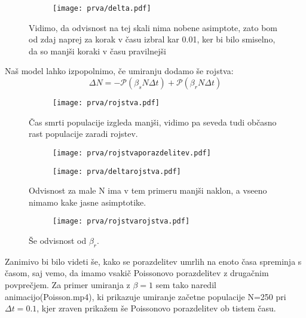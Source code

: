 \documentclass{article}
\begin{document}
\begin{figure}[H]
\centering
\begin{subfigure}{.7\textwidth}
\texttt{[image: prva/delta.pdf]}
\end{subfigure}
\caption*{Vidimo, da odvisnost na tej skali nima nobene asimptote, zato bom od zdaj naprej za korak v času izbral kar 0.01, ker bi bilo smiselno, da so manjši koraki v času pravilnejši}
\end{figure}

Naš model lahko izpopolnimo, če umiranju dodamo še rojstva:
\begin{equation*}
\Delta N = - \mathscr{P}(\beta_s N \Delta t) + \mathscr{P}(\beta_r N \Delta t)
\end{equation*}

\begin{figure}[H]
\centering
\begin{subfigure}{.7\textwidth}
\texttt{[image: prva/rojstva.pdf]}
\end{subfigure}
\caption*{Čas smrti populacije izgleda manjši, vidimo pa seveda tudi občasno rast populacije zaradi rojstev.}
\end{figure}

\begin{figure}[H]
\centering
\begin{subfigure}{.7\textwidth}
\texttt{[image: prva/rojstvaporazdelitev.pdf]}
\end{subfigure}
\caption*{}
\end{figure}

\begin{figure}[H]
\centering
\begin{subfigure}{.7\textwidth}
\texttt{[image: prva/deltarojstva.pdf]}
\end{subfigure}
\caption*{Odvisnost za male N ima v tem primeru manjši naklon, a vseeno nimamo kake jasne asimptotike.}
\end{figure}

\begin{figure}[H]
\centering
\begin{subfigure}{.7\textwidth}
\texttt{[image: prva/rojstvarojstva.pdf]}
\end{subfigure}
\caption*{Še odvisnost od $\beta_r$.}
\end{figure}

Zanimivo bi bilo videti še, kako se porazdelitev umrlih na enoto časa spreminja s časom, saj vemo, da imamo vsakič Poissonovo porazdelitev z drugačnim povprečjem. Za primer umiranja z $\beta=1$ sem tako naredil animacijo(Poisson.mp4), ki prikazuje umiranje začetne populacije N=250 pri $\Delta t = 0.1$, kjer zraven prikažem še Poissonovo porazdelitev ob tistem času.
\end{document}
